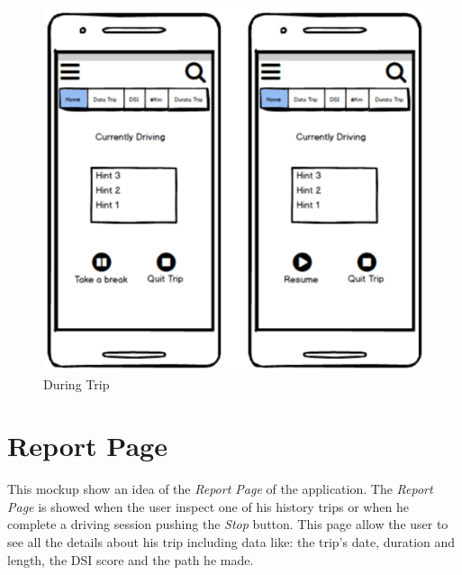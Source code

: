 \begin{figure}[htbp]
\centering
\includegraphics[width=\textwidth]{cpt/img/DuringTrip.png}
\caption{During Trip}
\end{figure}

\clearpage
\section{Report Page}
This mockup show an idea of the \textit{Report Page} of the application. The \textit{Report Page} is showed when the user inspect one of his history trips or when he complete a driving session pushing the \textit{Stop} button. This page allow the user to see all the details about his trip including data like: the trip's date, duration and length, the DSI score and the path he made.\\

